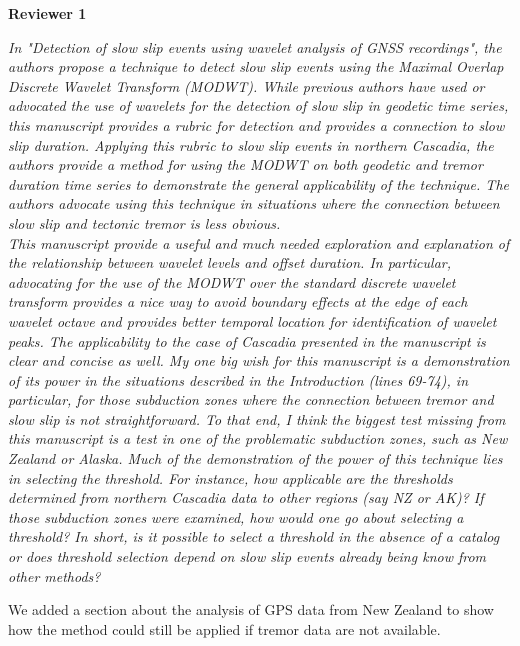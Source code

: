 \documentclass[letterpaper, 12pt]{article}
\begin{document}
\textbf{Reviewer 1}

\bigskip

\textit{In "Detection of slow slip events using wavelet analysis of GNSS recordings", the authors propose a technique to detect slow slip events using the Maximal Overlap Discrete Wavelet Transform (MODWT). While previous authors have used or advocated the use of wavelets for the detection of slow slip in geodetic time series, this manuscript provides a rubric for detection and provides a connection to slow slip duration. Applying this rubric to slow slip events in northern Cascadia, the authors provide a method for using the MODWT on both geodetic and tremor duration time series to demonstrate the general applicability of the technique. The authors advocate using this technique in situations where the connection between slow slip and tectonic tremor is less obvious.} \\

\textit{This manuscript provide a useful and much needed exploration and explanation of the relationship between wavelet levels and offset duration. In particular, advocating for the use of the MODWT over the standard discrete wavelet transform provides a nice way to avoid boundary effects at the edge of each wavelet octave and provides better temporal location for identification of wavelet peaks. The applicability to the case of Cascadia presented in the manuscript is clear and concise as well. My one big wish for this manuscript is a demonstration of its power in the situations described in the Introduction (lines 69-74), in particular, for those subduction zones where the connection between tremor and slow slip is not straightforward. To that end, I think the biggest test missing from this manuscript is a test in one of the problematic subduction zones, such as New Zealand or Alaska. Much of the demonstration of the power of this technique lies in selecting the threshold. For instance, how applicable are the thresholds determined from northern Cascadia data to other regions (say NZ or AK)? If those subduction zones were examined, how would one go about selecting a threshold? In short, is it possible to select a threshold in the absence of a catalog or does threshold selection depend on slow slip events already being know from other methods?}

\bigskip

We added a section about the analysis of GPS data from New Zealand to show how the method could still be applied if tremor data are not available.
\end{document}
